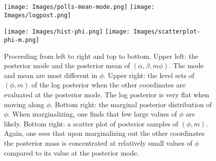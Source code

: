 \documentclass[11pt]{article}
\begin{document}
\begin{figure}
\label{fig:phi-mm}
\centering
\texttt{[image: Images/polls-mean-mode.png]}
\texttt{[image: Images/logpost.png]}

\texttt{[image: Images/hist-phi.png]}
\texttt{[image: Images/scatterplot-phi-m.png]}

\caption{Proceeding from left to right and top to bottom.  Upper left: the
  posterior mode and the posterior mean of $(\alpha, \beta, m \phi)$.  The mode
  and mean are most different in $\phi$.  Upper right: the level sets of $(\phi,
  m)$ of the log posterior when the other coordinates are evaluated at the
  posterior mode.  The log posterior is very flat when moving along $\phi$.
  Bottom right: the marginal posterior distribution of $\phi$.  When
  marginalizing, one finds that few large values of $\phi$ are likely.  Bottom
  right: a scatter plot of posterior samples of $(\phi, m)$. Again, one sees
  that upon marginalizing out the other coordinates the posterior mass is
  concentrated at relatively small values of $\phi$ compared to its value at the
  posterior mode.}
\end{figure}


{}
\end{document}

